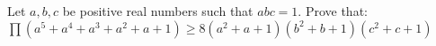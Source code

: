 Let $a,b,c$ be positive real numbers such that $abc = 1$. Prove that:$\displaystyle\prod(a^5+a^4+a^3+a^2+a+1)\geq 8(a^2+a+1)(b^2+b+1)(c^2+c+1)$